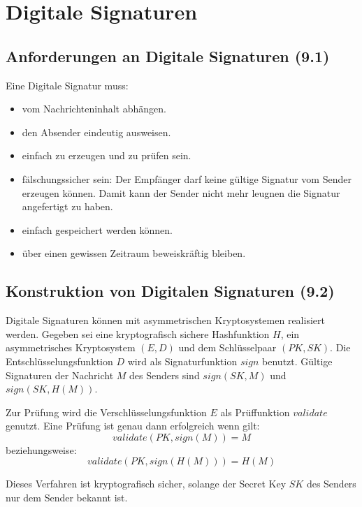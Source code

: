 \chapter{Digitale Signaturen}
\section{Anforderungen an Digitale Signaturen (9.1)}
Eine Digitale Signatur muss:
\begin{itemize}
  \item vom Nachrichteninhalt abhängen.
  \item den Absender eindeutig ausweisen.
  \item einfach zu erzeugen und zu prüfen sein.
  \item fälschungssicher sein: Der Empfänger darf keine gültige Signatur vom Sender erzeugen können. Damit kann der Sender nicht mehr leugnen die Signatur angefertigt zu haben.
  \item einfach gespeichert werden können.
  \item über einen gewissen Zeitraum beweiskräftig bleiben.
\end{itemize}

\section{Konstruktion von Digitalen Signaturen (9.2)}
Digitale Signaturen können mit asymmetrischen Kryptosystemen realisiert werden. Gegeben sei eine kryptografisch sichere Hashfunktion $H$, ein asymmetrisches Kryptosystem $(E,D)$ und dem Schlüsselpaar $(PK,SK)$. Die Entschlüsselungsfunktion $D$ wird als Signaturfunktion $sign$ benutzt. Gültige Signaturen der Nachricht $M$ des Senders sind $sign(SK, M)$ und $sign(SK, H(M))$.

Zur Prüfung wird die Verschlüsselungsfunktion $E$ als Prüffunktion $validate$ genutzt. Eine Prüfung ist genau dann erfolgreich wenn gilt:
$$
	validate(PK, sign(M)) = M
$$
beziehungsweise:
$$
	validate(PK, sign(H(M))) = H(M)
$$

Dieses Verfahren ist kryptografisch sicher, solange der Secret Key $SK$ des Senders nur dem Sender bekannt ist.

 

